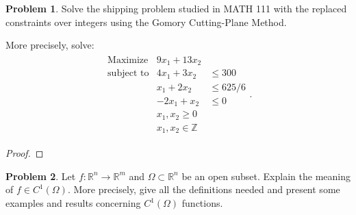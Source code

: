 \documentclass[12pt]{article}
\theoremstyle{definition}
\newtheorem{problem}{Problem}
\begin{document}
\begin{problem}
  Solve the shipping problem studied in MATH 111 with the replaced constraints over integers using the
  Gomory Cutting-Plane Method.

  More precisely, solve:
  \begin{align*}
    \begin{array}{lll}
      \text{Maximize} & 9x_1 + 13x_2 & \\
      \text{subject to} & 4x_1 + 3x_2 &\leq 300 \\
       & x_1 + 2x_2 &\leq 625/6 \\
       & -2x_1 + x_2 &\leq 0 \\
       & x_1, x_2 \geq 0 & \\
       & x_1, x_2 \in \mathbb{Z}&
    \end{array}.
  \end{align*}
\end{problem}

\begin{proof}
\end{proof}
\newpage


\begin{problem}
  Let $f:\mathbb{R}^n \to \mathbb{R}^m$ and $\Omega \subset \mathbb{R}^n$ be an open subset.
  Explain the meaning of $f\in C^1(\Omega)$. More precisely, give all the definitions needed and present some examples
  and results concerning $C^1(\Omega)$ functions.
\end{problem}
\end{document}
